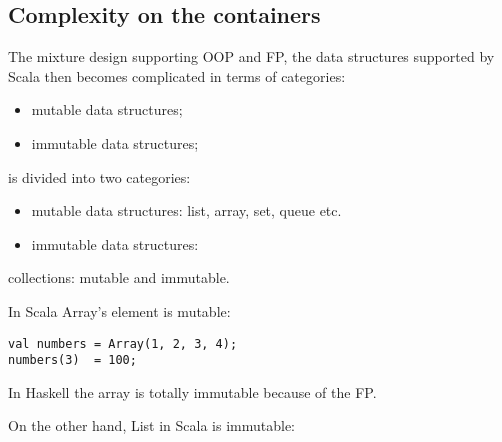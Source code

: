 \documentclass[notheorems, aspectratio=54]{beamer}
\begin{document}
\subsection{Complexity on the containers}
\begin{frame}

The mixture design supporting OOP and FP, the data structures supported by Scala 
then becomes complicated in terms of categories:
\begin{itemize}
 \item mutable data structures;
 \item immutable data structures;
 
\end{itemize}


is divided into two categories:
\begin{itemize}
 \item mutable data structures: list, array, set, queue etc.
 \item immutable data structures: 
\end{itemize}


\end{frame}

\begin{frame}[fragile]

collections: mutable and immutable.

In Scala Array's element is mutable:
\begin{verbatim}
val numbers = Array(1, 2, 3, 4);
numbers(3)  = 100; 
\end{verbatim}
In Haskell the array is totally immutable because of the FP.

On the other hand, List in Scala is immutable:
\begin{verbatim}
 
\end{verbatim}


\end{frame}

\end{document}
